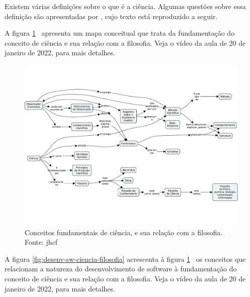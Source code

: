 
Existem várias definições sobre o que é a ciência. Algumas questões sobre essa definição são apresentadas por \citep{fernandes_consideracoes_2021}, cujo texto está reproduzido a seguir. 

A figura \ref{fig:ciencia-filosofia}~ apresenta um mapa conceitual que trata da fundamentação do conceito de ciência e sua relação com a filosofia.
Veja o vídeo da aula de 20 de janeiro de 2022, para mais detalhes.

\begin{figure}
    \centering
    \includegraphics[page=1,angle=90,width=1\textwidth]{1-Introducao/aulas/Ciencia-e-Filosofia.pdf}
    \caption{Conceitos fundamentais de ciência, e sua relação com a filosofia. Fonte: jhcf}
    \label{fig:ciencia-filosofia}
\end{figure}

A figura \ref{fig:desenv-sw-ciencia-filosofia} acrescenta à figura  \ref{fig:ciencia-filosofia}~ os conceitos que relacionam a natureza do desenvolvimento de software à  fundamentação do conceito de ciência e sua relação com a filosofia.
Veja o vídeo  da aula de 20 de janeiro de 2022, para mais detalhes.

